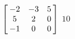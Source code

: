 {$\left[\hskip -3pt \begin{array}{ccc} -2&-3&5\\  5&2&0
\\  -1&0&0\end{array}\hskip -3pt \right]$} 
{$10$}



  

